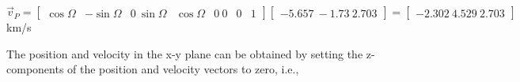 $\vec{v}_{P} = \begin{bmatrix} \cos\Omega & -\sin\Omega & 0 \ \sin\Omega & \cos\Omega & 0 \ 0 & 0 & 1 \end{bmatrix} \begin{bmatrix} -5.657 \ -1.73 \ 2.703 \end{bmatrix} = \begin{bmatrix} -2.302 \ 4.529 \ 2.703 \end{bmatrix}$ km/s

The position and velocity in the x-y plane can be obtained by setting the z-components of the position and velocity vectors to zero, i.e.,